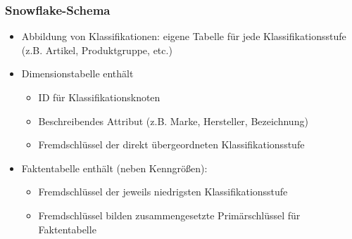             \begin{frame}
        
            \frametitle{Snowflake-Schema}
        
            \begin{itemize}
            \item Abbildung von Klassifikationen: eigene Tabelle für jede
              Klassifikationsstufe (z.B. Artikel, Produktgruppe, etc.)
            \item Dimensionstabelle enthält
              \begin{itemize}
              \item ID für Klassifikationsknoten
              \item Beschreibendes Attribut (z.B. Marke, Hersteller, Bezeichnung)
              \item Fremdschlüssel der direkt übergeordneten Klassifikationsstufe
              \end{itemize}
            \item Faktentabelle enthält (neben Kenngrößen):
              \begin{itemize}
              \item Fremdschlüssel der jeweils niedrigsten Klassifikationsstufe
              \item Fremdschlüssel bilden zusammengesetzte Primärschlüssel für
                Faktentabelle
              \end{itemize}
            \end{itemize}
        
            \end{frame}
        
